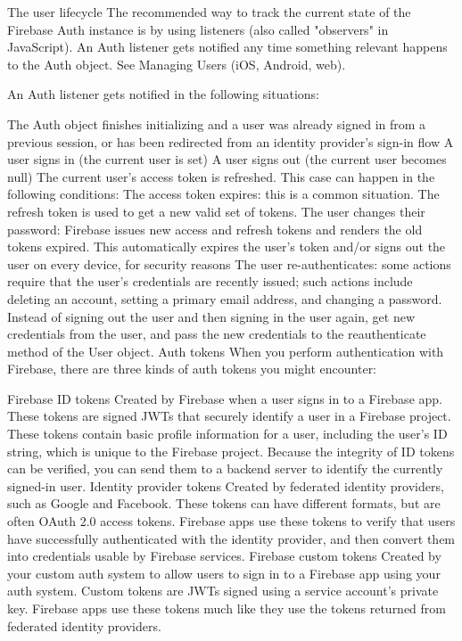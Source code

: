 The user lifecycle
The recommended way to track the current state of the Firebase Auth instance is by using listeners (also called "observers" in JavaScript). An Auth listener gets notified any time something relevant happens to the Auth object. See Managing Users (iOS, Android, web).

An Auth listener gets notified in the following situations:

The Auth object finishes initializing and a user was already signed in from a previous session, or has been redirected from an identity provider's sign-in flow
A user signs in (the current user is set)
A user signs out (the current user becomes null)
The current user's access token is refreshed. This case can happen in the following conditions:
The access token expires: this is a common situation. The refresh token is used to get a new valid set of tokens.
The user changes their password: Firebase issues new access and refresh tokens and renders the old tokens expired. This automatically expires the user's token and/or signs out the user on every device, for security reasons
The user re-authenticates: some actions require that the user's credentials are recently issued; such actions include deleting an account, setting a primary email address, and changing a password. Instead of signing out the user and then signing in the user again, get new credentials from the user, and pass the new credentials to the reauthenticate method of the User object.
Auth tokens
When you perform authentication with Firebase, there are three kinds of auth tokens you might encounter:

Firebase ID tokens	Created by Firebase when a user signs in to a Firebase app. These tokens are signed JWTs that securely identify a user in a Firebase project. These tokens contain basic profile information for a user, including the user's ID string, which is unique to the Firebase project. Because the integrity of ID tokens can be verified, you can send them to a backend server to identify the currently signed-in user.
Identity provider tokens	Created by federated identity providers, such as Google and Facebook. These tokens can have different formats, but are often OAuth 2.0 access tokens. Firebase apps use these tokens to verify that users have successfully authenticated with the identity provider, and then convert them into credentials usable by Firebase services.
Firebase custom tokens	Created by your custom auth system to allow users to sign in to a Firebase app using your auth system. Custom tokens are JWTs signed using a service account's private key. Firebase apps use these tokens much like they use the tokens returned from federated identity providers.



